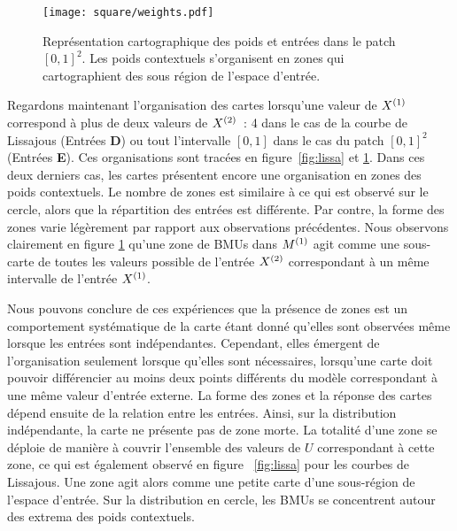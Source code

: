 \documentclass[../main]{subfiles}
\begin{document}
\begin{figure}[H]
	\centering\texttt{[image: square/weights.pdf]}
	\caption{Représentation cartographique des poids et entrées dans le patch $[0,1]^2$. Les poids contextuels s'organisent en zones qui cartographient des sous région de l'espace d'entrée. \label{fig:ind}}
\end{figure}

Regardons maintenant l'organisation des cartes lorsqu'une valeur de $X^{({1})}$ correspond à plus de deux valeurs de $X^{({2})}$~: 4 dans le cas de la courbe de Lissajous (Entrées \textbf{D}) ou tout l'intervalle $[0,1]$ dans le cas du patch $[0,1]^2$ (Entrées \textbf{E}). 
Ces organisations sont tracées en figure~\ref{fig:lissa} et \ref{fig:ind}.
Dans ces deux derniers cas, les cartes présentent encore une organisation en zones des poids contextuels.
Le nombre de zones est similaire à ce qui est observé sur le cercle, alors que la répartition des entrées est différente. Par contre, la forme des zones varie légèrement par rapport aux observations précédentes.
Nous observons clairement en figure \ref{fig:ind} qu'une zone de BMUs dans $M^{({1})}$ agit comme une sous-carte de toutes les valeurs possible de l'entrée $X^{({2})}$ correspondant à un même intervalle de l'entrée  $X^{({1})}$.


Nous pouvons conclure de ces expériences que la présence de zones est un comportement systématique de la carte étant donné qu'elles sont observées même lorsque les entrées sont indépendantes. 
Cependant, elles émergent de l'organisation seulement lorsque qu'elles sont nécessaires, lorsqu'une carte doit pouvoir différencier au moins deux points différents du modèle correspondant à une même valeur d'entrée externe.
La forme des zones et la réponse des cartes dépend ensuite de la relation entre les entrées.
Ainsi, sur la distribution indépendante, la carte ne présente pas de zone morte. La totalité d'une zone se déploie de manière à couvrir l'ensemble des valeurs de $U$ correspondant à cette zone, ce qui est également observé en figure ~\ref{fig:lissa} pour les courbes de Lissajous. Une zone agit alors comme une petite carte d'une sous-région de l'espace d'entrée. Sur la distribution en cercle, les BMUs se concentrent autour des extrema des poids contextuels.
\end{document}
